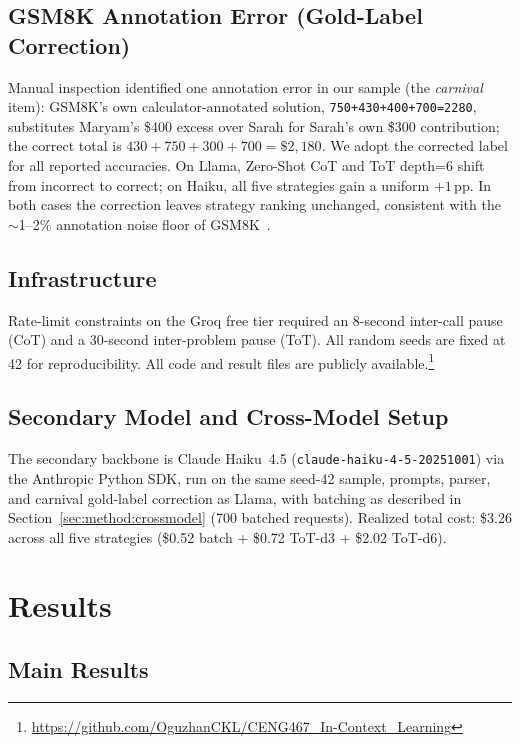 \documentclass[conference]{IEEEtran}
\begin{document}
\subsection{GSM8K Annotation Error (Gold-Label Correction)}
Manual inspection identified one annotation error in our sample (the
\textit{carnival} item): GSM8K's own calculator-annotated solution,
\texttt{750+430+400+700=2280}, substitutes Maryam's \$400 excess over
Sarah for Sarah's own \$300 contribution; the correct total is
$430+750+300+700=\$2{,}180$. We adopt the corrected label for all
reported accuracies. On Llama, Zero-Shot CoT and ToT depth=6 shift
from incorrect to correct; on Haiku, all five strategies gain a
uniform $+1$\,pp. In both cases the correction leaves strategy ranking
unchanged, consistent with the $\sim$1--2\% annotation noise floor of
GSM8K~\cite{cobbe2021gsm8k}.

\subsection{Infrastructure}
Rate-limit constraints on the Groq free tier required an 8-second
inter-call pause (CoT) and a 30-second inter-problem pause (ToT).
All random seeds are fixed at 42 for reproducibility.
All code and result files are publicly available.\footnote{\url{https://github.com/OguzhanCKL/CENG467_In-Context_Learning}}

\subsection{Secondary Model and Cross-Model Setup}
\label{sec:setup:crossmodel}
The secondary backbone is Claude Haiku~4.5
(\texttt{claude-haiku-4-5-20251001}) via the Anthropic Python SDK,
run on the same seed-42 sample, prompts, parser, and carnival
gold-label correction as Llama, with batching as described in
Section~\ref{sec:method:crossmodel} (700 batched requests).
Realized total cost: \$3.26 across all five strategies
(\$0.52 batch + \$0.72 ToT-d3 + \$2.02 ToT-d6).

\section{Results}
\label{sec:results}

\subsection{Main Results}
\end{document}
